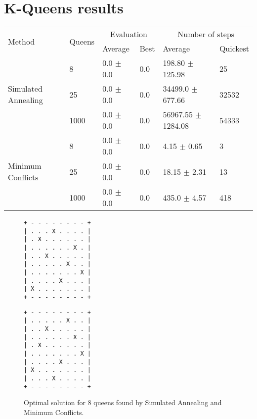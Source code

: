 \section{K-Queens results}


\begin{table*}\centering
    \caption{}
    \label{tab:kqueens}
	\vspace{2mm}
	\begin{tabular}{llllll}
		\toprule[2.0px]
			\multirow{2}{*}{Method} & 
			\multirow{2}{*}{Queens} & 
			\multicolumn{2}{c}{Evaluation} 	& 
			\multicolumn{2}{c}{Number of steps}\\
			   &          & Average & Best & Average & Quickest \\ 
		\midrule
		\multirow{3}{*}{Simulated Annealing} 
			& 8  & 0.0 $\pm$ 0.0 & 0.0 & 198.80 $\pm$ 125.98 & 25\\ %
			& 25 & 0.0 $\pm$ 0.0 & 0.0 & 34499.0 $\pm$ 677.66 & 32532 \\ %
			& 1000 &  0.0 $\pm$ 0.0 & 0.0 & 56967.55 $\pm$ 1284.08 & 54333\\ %
		\midrule
		\multirow{3}{*}{Minimum Conflicts}
			& 8  & 0.0 $\pm$ 0.0 & 0.0 & 4.15 $\pm$ 0.65 & 3\\ %
			& 25 & 0.0 $\pm$ 0.0 & 0.0 & 18.15 $\pm$ 2.31 & 13\\ %
			& 1000 & 0.0 $\pm$ 0.0 & 0.0 & 435.0 $\pm$ 4.57 & 418\\ %
		\bottomrule[2.0px]
	\end{tabular}
\end{table*}

\begin{figure}[h]
	\centering
	\caption{Optimal solution for 8 queens found by Simulated Annealing and Minimum Conflicts.}
	\label{kqueens_demo}
\begin{minipage}{0.4\textwidth}
		\begin{verbatim}
+ - - - - - - - - +
| . . . X . . . . |
| . X . . . . . . |
| . . . . . . X . |
| . . X . . . . . |
| . . . . . X . . |
| . . . . . . . X |
| . . . . X . . . |
| X . . . . . . . |
+ - - - - - - - - +
		\end{verbatim}
\end{minipage}
\begin{minipage}{0.4\textwidth}
		\begin{verbatim}
+ - - - - - - - - +
| . . . . . X . . |
| . . X . . . . . |
| . . . . . . X . |
| . X . . . . . . |
| . . . . . . . X |
| . . . . X . . . |
| X . . . . . . . |
| . . . X . . . . |
+ - - - - - - - - +
		\end{verbatim}
\end{minipage}
\end{figure}